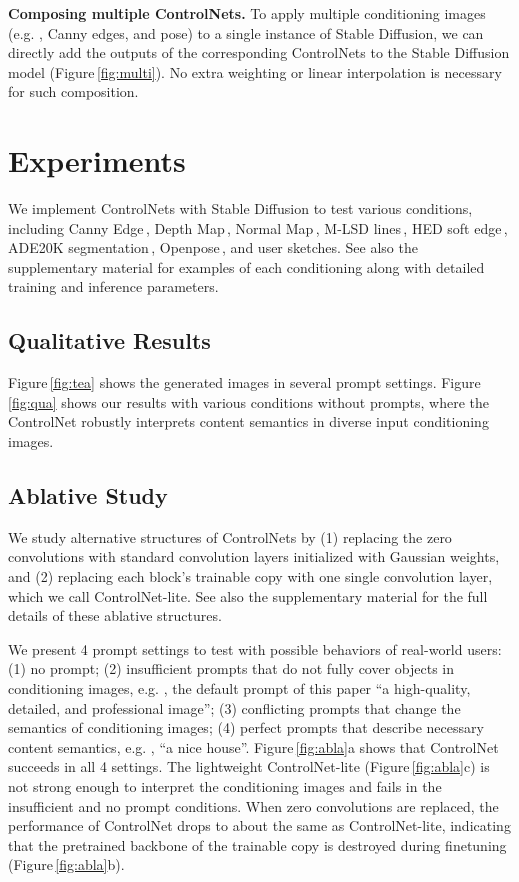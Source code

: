 	\textbf{Composing multiple ControlNets.} To apply multiple conditioning images (e.g. , Canny edges, and pose) to a single instance of Stable Diffusion, we can directly add the outputs of the corresponding ControlNets to the Stable Diffusion model (Figure\,\ref{fig:multi}). No extra weighting or linear interpolation is necessary for such composition.

	\section{Experiments}
	\label{sec:exp}

	We implement ControlNets with Stable Diffusion to test various conditions, including Canny Edge\,\cite{canny1986computational}, Depth
	Map\,\cite{ranftl2020towards}, Normal Map\,\cite{diode_dataset}, M-LSD
	lines\,\cite{gu2021realtime}, HED soft
	edge\,\cite{xie2015holistically}, ADE20K
	segmentation\,\cite{zhou2017scene}, Openpose\,\cite{cao2019openpose},
	and user sketches. See also the supplementary material for examples of each conditioning along with detailed training and inference parameters.

	\subsection{Qualitative Results}

	Figure\,\ref{fig:tea} shows the generated images in several prompt settings. Figure\,\ref{fig:qua} shows our results with various conditions without prompts, where the ControlNet robustly interprets content semantics in diverse input conditioning images.

	\subsection{Ablative Study}

	We study alternative structures of ControlNets by (1) replacing the zero convolutions with standard convolution layers initialized with Gaussian weights, and (2) replacing each block's trainable copy with one single convolution layer, which we call ControlNet-lite. See also the supplementary material for the full details of these ablative structures.

	We present 4 prompt settings to test with possible behaviors of real-world users: (1) no prompt; (2) insufficient prompts that do not fully cover objects in conditioning images, e.g. , the default prompt of this paper ``a high-quality, detailed, and professional image''; (3) conflicting prompts that change the semantics of conditioning images; (4) perfect prompts that describe necessary content semantics, e.g. , ``a nice house''.
	Figure\,\ref{fig:abla}a shows that ControlNet succeeds in all 4 settings. The lightweight ControlNet-lite (Figure\,\ref{fig:abla}c) is not strong enough to interpret the conditioning images and fails in the insufficient and no prompt conditions. When zero convolutions are replaced, the performance of ControlNet drops to about the same as ControlNet-lite, indicating that the pretrained backbone of the trainable copy is destroyed during finetuning (Figure\,\ref{fig:abla}b).

